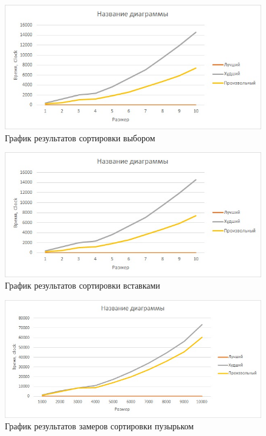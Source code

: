 

\begin{figure}[H]
	\centering
	\includegraphics[width=0.7\linewidth]{../Рисунки/insertPic}
	\caption{График результатов сортировки выбором}
	\label{fig:insertpic}
\end{figure}

\begin{figure}[H]
	\centering
	\includegraphics[width=0.7\linewidth]{../Рисунки/pic2}
	\caption{График результатов сортировки вставками}
	\label{fig:pic2}
\end{figure}

\begin{figure}[H]
	\centering
	\includegraphics[width=0.7\linewidth]{../Рисунки/pic3}
	\caption[Га]{График результатов замеров сортировки пузырьком}
	\label{fig:pic3}
\end{figure}